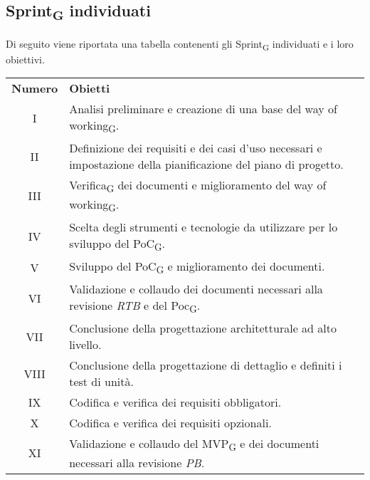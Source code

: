 \subsection{Sprint\textsubscript{G} individuati}
Di seguito viene riportata una tabella contenenti gli Sprint\textsubscript{G} individuati e i loro obiettivi.
\begin{center}
	\renewcommand\tabularxcolumn[1]{>{\Centering}m{#1}}
	\setlength\extrarowheight{5pt}
	\begin{tabularx}{\textwidth}{| c | X |} 
		\hline
		\rowcolor{white}
		\textbf{Numero} & \textbf{Obietti}\\
		I &  Analisi preliminare e creazione di una base del way of working\textsubscript{G}. \\
		II & Definizione dei requisiti e dei casi d'uso necessari e impostazione della pianificazione del piano di progetto. \\
		III & Verifica\textsubscript{G} dei documenti e miglioramento del way of working\textsubscript{G}. \\
		IV & Scelta degli strumenti e tecnologie da utilizzare per lo sviluppo del PoC\textsubscript{G}. \\
		V & Sviluppo del PoC\textsubscript{G} e miglioramento dei documenti. \\
		VI & Validazione e collaudo dei documenti necessari alla revisione \textit{RTB} e del Poc\textsubscript{G}.\\
		VII & Conclusione della progettazione architetturale ad alto livello. \\
		VIII & Conclusione della progettazione di dettaglio e definiti i test di unità. \\
		IX & Codifica e verifica dei requisiti obbligatori. \\
		X & Codifica e verifica dei requisiti opzionali. \\
		XI & Validazione e collaudo del MVP\textsubscript{G} e dei documenti necessari alla revisione \textit{PB}.\\
		\hline
	\end{tabularx}
\end{center}